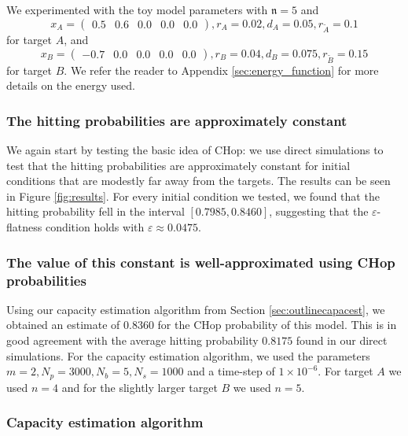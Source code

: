 \documentclass[english, aip, jcp, priprint, graphicx,floatfix]{revtex4-1}
\theoremstyle{plain}
\theoremstyle{definition}
\theoremstyle{plain}
\newcommand{\dimension}{{\mathfrak{n}}}
\begin{document}
We experimented with the toy model parameters with $\dimension = 5$ and
\begin{equation*}
x_A = \begin{pmatrix}%
0.5&0.6&0.0&0.0&0.0%
\end{pmatrix},
r_A = 0.02,
d_A = 0.05,
r_{\tilde{A}} = 0.1
\end{equation*}
for target $A$, and
\begin{equation*}
x_B = \begin{pmatrix}%
-0.7&0.0&0.0&0.0&0.0%
\end{pmatrix},
r_B = 0.04,
d_B = 0.075,
r_{\tilde{B}} = 0.15
\end{equation*}
for target $B$. We refer the reader to Appendix \ref{sec:energy_function} for more details on the energy used.

\subsubsection{The hitting probabilities are approximately constant}

We again start by testing the basic idea of CHop: we use direct simulations to test that the hitting probabilities are approximately constant for initial conditions that are modestly far away from the targets.  The results can be seen in Figure \ref{fig:results}.   For every initial condition we tested, we found that the hitting probability fell in the interval $[0.7985, 0.8460]$, suggesting that the $\varepsilon$-flatness condition holds with $\varepsilon \approx 0.0475$.



\subsubsection{The value of this constant is well-approximated using CHop probabilities}

Using our capacity estimation algorithm from Section \ref{sec:outlinecapacest}, we obtained an estimate of $0.8360$ for the CHop probability of this model.  This is in good agreement with the average hitting probability $0.8175$ found in our direct simulations.  For the capacity estimation algorithm, we used the parameters $ m = 2, N_p = 3000, N_b = 5, N_s = 1000$ and a time-step of $1 \times 10^{-6}$.  For target $A$ we used $n = 4$ and for the slightly larger target $B$ we used $n = 5$.  

\subsubsection{Capacity estimation algorithm}
\end{document}
